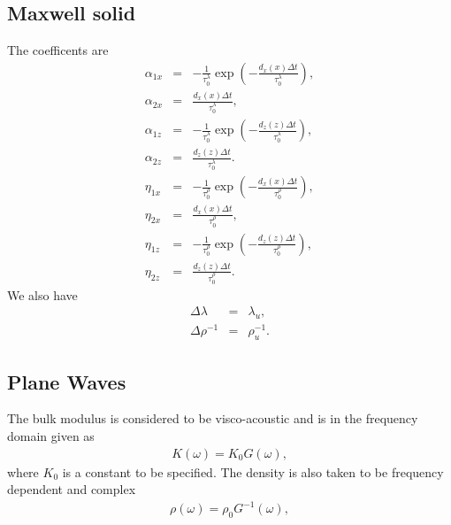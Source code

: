 \documentclass[11pt]{article}
\begin{document}
\subsection*{Maxwell solid}
The coefficents are
\begin{eqnarray}
  \alpha_{1x} & = & -\frac{1}{\tau^{\lambda}_0}\exp\left(-\frac{d_x(x)\Delta t}
                          {\tau^{\lambda}_0}\right),              \\
  \alpha_{2x} & = & \frac{d_x(x)\Delta t}
                  {\tau^{\lambda}_0},                             \\
  \alpha_{1z} & = & -\frac{1}{\tau^{\lambda}_0}\exp\left(-\frac{d_z(z)\Delta t}
                  {\tau^{\lambda}_0}\right),                      \\
  \alpha_{2z}  & = & \frac{d_z(z)\Delta t}
                  {\tau^{\lambda}_0}.                             \\
  \eta_{1x} & = & -\frac{1}{\tau^{\rho}_0}\exp\left(-\frac{d_x(x)\Delta t}
                          {\tau^{\rho}_0}\right),                 \\
  \eta_{2x} & = & \frac{d_x(x)\Delta t}
                  {\tau^{\rho}_0},                                \\
  \eta_{1z} & = & -\frac{1}{\tau^{\rho}_0}\exp\left(-\frac{d_z(z)\Delta t}
                  {\tau^{\rho}_0}\right),                         \\
  \eta_{2z}  & = & \frac{d_z(z)\Delta t}
                  {\tau^{\rho}_0}.                                
\end{eqnarray}
We also have
\begin{eqnarray}
  \Delta \lambda 
    & = & \lambda_u,                  \\
  \Delta \rho^{-1} 
    & = & \rho^{-1}_u.
\end{eqnarray}
\subsection*{Plane Waves }
The bulk modulus is considered to be visco-acoustic and is in the
frequency domain given as
\begin{eqnarray}
 K(\omega) = K_0 G(\omega),
                                    \label{eq:12}
\end{eqnarray}
where $K_0$ is a constant to be specified.
The density is also taken to be frequency dependent and complex
\begin{eqnarray}
 \rho(\omega) = \rho_0 G^{-1}(\omega),
                                    \label{eq:13}
\end{eqnarray}
\end{document}
